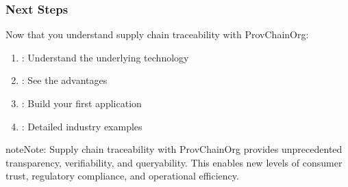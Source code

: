 \documentclass[letterpaper,10pt,english]{sphinxmanual}
\begin{document}
\subsubsection{Next Steps}
\label{\detokenize{foundational/intro-to-supply-chain-traceability:next-steps}}
\sphinxAtStartPar
Now that you understand supply chain traceability with ProvChainOrg:
\begin{enumerate}
%
\item {} 
\sphinxAtStartPar
{}: {\hyperref[\detokenize{foundational/intro-to-rdf-blockchain::doc}]{}} \sphinxhyphen{} Understand the underlying technology

\item {} 
\sphinxAtStartPar
{}:  \sphinxhyphen{} See the advantages

\item {} 
\sphinxAtStartPar
{}: {\hyperref[\detokenize{tutorials/first-supply-chain::doc}]{}} \sphinxhyphen{} Build your first application

\item {} 
\sphinxAtStartPar
{}:  \sphinxhyphen{} Detailed industry examples

\end{enumerate}

\begin{sphinxadmonition}{note}{Note:}
\sphinxAtStartPar
Supply chain traceability with ProvChainOrg provides unprecedented transparency, verifiability, and queryability. This enables new levels of consumer trust, regulatory compliance, and operational efficiency.
\end{sphinxadmonition}
\end{document}
